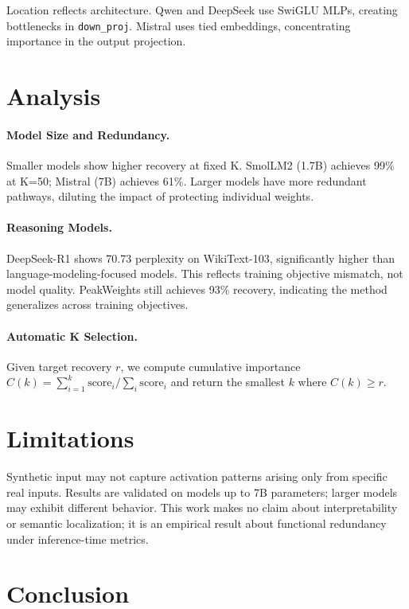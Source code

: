 \documentclass{article}
\begin{document}
Location reflects architecture. Qwen and DeepSeek use SwiGLU MLPs, creating bottlenecks in \texttt{down\_proj}. Mistral uses tied embeddings, concentrating importance in the output projection.

\section{Analysis}

\paragraph{Model Size and Redundancy.} Smaller models show higher recovery at fixed K. SmolLM2 (1.7B) achieves 99\% at K=50; Mistral (7B) achieves 61\%. Larger models have more redundant pathways, diluting the impact of protecting individual weights.

\paragraph{Reasoning Models.} DeepSeek-R1 shows 70.73 perplexity on WikiText-103, significantly higher than language-modeling-focused models. This reflects training objective mismatch, not model quality. PeakWeights still achieves 93\% recovery, indicating the method generalizes across training objectives.

\paragraph{Automatic K Selection.} Given target recovery $r$, we compute cumulative importance $C(k) = \sum_{i=1}^{k} \text{score}_i / \sum_i \text{score}_i$ and return the smallest $k$ where $C(k) \geq r$.

\section{Limitations}

Synthetic input may not capture activation patterns arising only from specific real inputs. Results are validated on models up to 7B parameters; larger models may exhibit different behavior. This work makes no claim about interpretability or semantic localization; it is an empirical result about functional redundancy under inference-time metrics.

\section{Conclusion}
\end{document}
